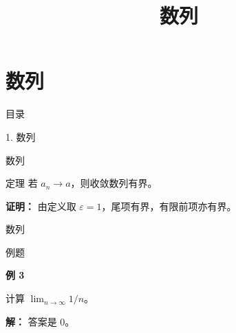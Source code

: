 \documentclass[aspectratio=169,10pt,fontset=fandol]{ctexbeamer}
\title{数列}
\begin{document}
\section{数列}
\begin{frame}[t,fragile]{目录}
\normalsize
{\color{blue}\normalsize 1. 数列\par}\vspace{0.22em}
\end{frame}
\begin{frame}[t,fragile]{数列}
\normalsize
\begin{block}{定理}
{\normalsize
若 $a_n\to a$，则收敛数列有界。
}
\end{block}
\pause
{\normalsize
\textbf{证明：}
由定义取 $\varepsilon=1$，尾项有界，有限前项亦有界。
}
\end{frame}
\begin{frame}[t,fragile]{数列}
\normalsize
\begin{block}{例题}
{\normalsize
\textbf{例 3}\par
计算 $\lim_{n\to\infty}1/n$。
}
\end{block}
\pause
{\normalsize
\textbf{解：}
答案是 $0$。
}
\end{frame}
\end{document}
